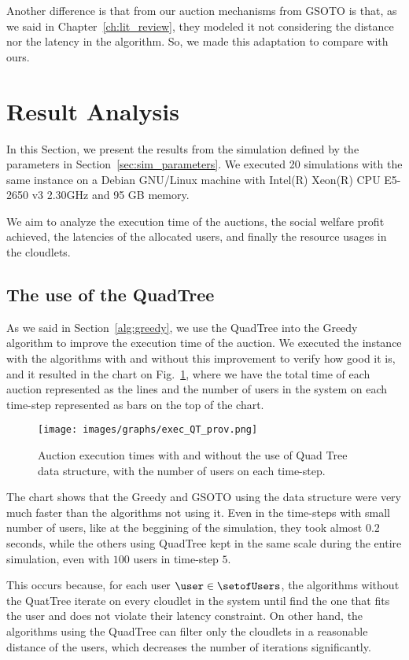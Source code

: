 \documentclass[English]{ic-tese-v3}
\begin{document}
Another difference is that from our auction mechanisms from GSOTO is that, as we said in Chapter~\ref{ch:lit_review}, they modeled it not considering the distance nor the latency in the algorithm. So, we made this adaptation to compare with ours.

\section{Result Analysis}
\label{sec:analysis}
In this Section, we present the results from the simulation defined by the parameters in Section~\ref{sec:sim_parameters}. We executed 20 simulations with the same instance on a Debian GNU/Linux machine with Intel(R) Xeon(R) CPU E5-2650 v3 2.30GHz and 95 GB memory.

We aim to analyze the execution time of the auctions, the social welfare profit achieved, the latencies of the allocated users, and finally the resource usages in the cloudlets.

\subsection{The use of the QuadTree}
As we said in Section~\ref{alg:greedy}, we use the QuadTree into the Greedy algorithm to improve the execution time of the auction. We executed the instance with the algorithms with and without this improvement to verify how good it is, and it resulted in the chart on Fig.~\ref{fig:exec_qt}, where we have the total time of each auction represented as the lines and the number of users in the system on each time-step represented as bars on the top of the chart.
\begin{figure}[H]
    \centering
    \texttt{[image: images/graphs/exec\_QT\_prov.png]}
    \caption{Auction execution times with and without the use of Quad Tree data structure, with the number of users on each time-step.}
    \label{fig:exec_qt}
\end{figure}
The chart shows that the Greedy and GSOTO using the data structure were very much faster than the algorithms not using it. Even in the time-steps with small number of users, like at the beggining of the simulation, they  took almost $0.2$ seconds, while the others using QuadTree kept in the same scale during the entire simulation, even with $100$ users in time-step $5$.

This occurs because, for each user $\user \in \setofUsers$,  the algorithms without the QuatTree iterate on every cloudlet in the system until find the one that fits the user and does not violate their latency constraint. On other hand, the algorithms using the QuadTree can filter only the cloudlets in a reasonable distance of the users, which decreases the number of iterations significantly.
\end{document}
